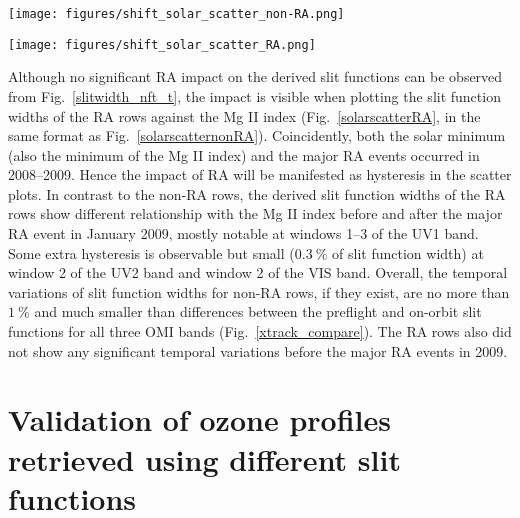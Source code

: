\documentclass[amt,manuscript]{copernicus}
\begin{document}
\begin{figure*}[tbhp]
\texttt{[image: figures/shift\_solar\_scatter\_non-RA.png]}
\caption{Scatter plots between the average slit function FWHM of all non-RA rows (assuming standard Gaussian) and the Mg II index. The columns and rows are the same as Fig.~\ref{slitwidth_nft_t}. The linear fitting slopes between the normalized slit function widths and the normalized Mg II index are shown in the title of each subplot.} %
\label{solarscatternonRA}
\end{figure*}

\begin{figure*}[tbhp]
\texttt{[image: figures/shift\_solar\_scatter\_RA.png]}
\caption{The same as Fig.~\ref{solarscatternonRA} but for the RA rows. The ranges of vertical axises are the same as Fig.~\ref{solarscatternonRA} as well for easier comparison.}
\label{solarscatterRA}
\end{figure*}
Although no significant RA impact on the derived slit functions can be observed from Fig.~\ref{slitwidth_nft_t}, the impact is visible when plotting the slit function widths of the RA rows against the Mg II index (Fig.~\ref{solarscatterRA}, in the same format as Fig.~\ref{solarscatternonRA}). Coincidently, both the solar minimum (also the minimum of the Mg II index) and the major RA events occurred in 2008--2009. Hence the impact of RA will be manifested as hysteresis in the scatter plots. In contrast to the non-RA rows, the derived slit function widths of the RA rows show different relationship with the Mg II index before and after the major RA event in January 2009, mostly notable at windows 1--3 of the UV1 band. Some extra hysteresis is observable but small ($0.3~\%$ of slit function width) at window 2 of the UV2 band and window 2 of the VIS band. Overall, the temporal variations of slit function widths for non-RA rows, if they exist, are no more than $1~\%$ and much smaller than differences between the preflight and on-orbit slit functions for all three OMI bands (Fig.~\ref{xtrack_compare}). The RA rows also did not show any significant temporal variations before the major RA events in 2009.


\section{Validation of ozone profiles retrieved using different slit functions}
\end{document}
